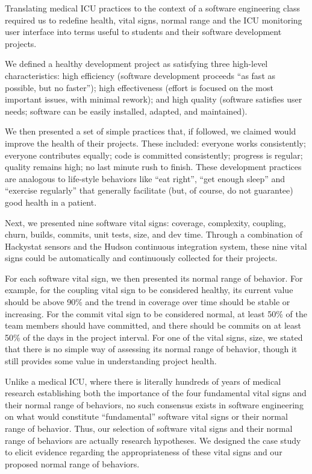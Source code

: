\documentclass[times,10pt,twocolumn]{article}
\begin{document}
Translating medical ICU practices to the context of a software engineering
class required us to redefine health, vital signs, normal range
and the ICU monitoring user interface into terms useful to students and their
software development projects.

We defined a healthy development project as satisfying three high-level
characteristics: high efficiency (software development proceeds ``as fast
as possible, but no faster''); high effectiveness (effort is focused on the
most important issues, with minimal rework); and high quality (software
satisfies user needs; software can be easily installed, adapted, and
maintained).

We then presented a set of simple practices that, if followed, we claimed
would improve the health of their projects.  These
included: everyone works consistently; everyone contributes equally; code
is committed consistently; progress is regular; quality remains high; no
last minute rush to finish.  These development practices are analogous to
life-style behaviors like ``eat right'', ``get enough sleep'' and
``exercise regularly'' that generally facilitate (but, of course, do not
guarantee) good health in a patient.

Next, we presented nine software vital signs: coverage, complexity,
coupling, churn, builds, commits, unit tests, size, and dev
time. Through a combination of Hackystat sensors and the Hudson continuous
integration system, these nine vital signs could be automatically and
continuously collected for their projects.

For each software vital sign, we then presented its normal range of
behavior.  For example, for the coupling vital sign to be considered
healthy, its current value should be above 90\% and the trend in
coverage over time should be stable or increasing.  For the commit vital
sign to be considered normal, at least 50\% of the team members should have
committed, and there should be commits on at least 50\% of the days in the
project interval.  For one of the vital signs, size, we stated that
there is no simple way of assessing its normal range of behavior, though
it still provides some value in understanding project health.

Unlike a medical ICU, where there is literally hundreds of years of medical
research establishing both the importance of the four fundamental vital
signs and their normal range of behaviors, no such consensus exists in
software engineering on what would constitute ``fundamental'' software
vital signs or their normal range of behavior.  Thus, our selection of
software vital signs and their normal range of behaviors are actually
research hypotheses.  We designed the case study to elicit evidence
regarding the appropriateness of these vital signs and our proposed normal
range of behaviors.
\end{document}
